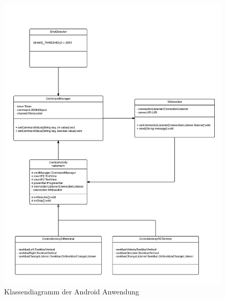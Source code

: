 \begin{figure}
	\includegraphics[width=\textwidth]{images/uml_android_app.pdf}
	\caption{Klassendiagramm der Android Anwendung}
	\label{fig:android_uml}
\end{figure}

